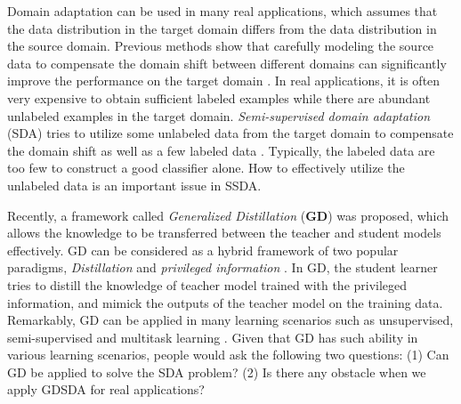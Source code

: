 
Domain adaptation can be used in many real applications, which assumes that the data distribution in the target domain differs from the data distribution in the source domain. Previous methods show that carefully modeling the source data to compensate the domain shift between different domains can significantly improve the performance on the target domain \cite{Donahue_2013_CVPR}. In real applications, it is often very expensive to obtain sufficient labeled examples while there are abundant unlabeled examples in the target domain. 
\textit{Semi-supervised domain adaptation} (SDA) tries to utilize some unlabeled data from the target domain to compensate the domain shift as well as a few labeled data \cite{karl2001long}. Typically, the labeled data are too few to  construct a good classifier alone. How to effectively utilize the unlabeled data is an important issue in SSDA. 

Recently, a framework called \textit{Generalized Distillation} (\textbf{GD}) \cite{lopez2015unifying} was proposed, which allows the knowledge to be transferred between the teacher and student models effectively. GD can be considered as a hybrid framework of two popular paradigms, \textit{Distillation} \cite{hinton2015distilling} and \textit{privileged information} \cite{vapnik2015learning}. In GD, the student learner tries to distill the knowledge of teacher model trained with the privileged information, and mimick the outputs of the teacher model on the training data. Remarkably, GD can be applied in many learning scenarios such as unsupervised, semi-supervised and multitask learning \cite{lopez2015unifying}. Given that GD has such ability in various learning scenarios, people would ask the following two questions: (1) Can GD be applied to solve the SDA problem? (2) Is there any obstacle when we apply GDSDA for real applications?


